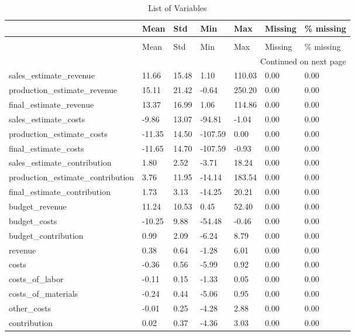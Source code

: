 \begin{landscape}\begin{longtable}[h!]{lllllll}
\caption{List of Variables} \label{eda_1} \\
\toprule
 & Mean & Std & Min & Max & Missing & \% missing \\
\midrule
\endfirsthead
\caption[]{List of Variables} \\
\toprule
 & Mean & Std & Min & Max & Missing & \% missing \\
\midrule
\endhead
\midrule
\multicolumn{7}{r}{Continued on next page} \\
\midrule
\endfoot
\bottomrule
\endlastfoot
sales_estimate_revenue & 11.66 & 15.48 & 1.10 & 110.03 & 0.00 & 0.00 \\
production_estimate_revenue & 15.11 & 21.42 & -0.64 & 250.20 & 0.00 & 0.00 \\
final_estimate_revenue & 13.37 & 16.99 & 1.06 & 114.86 & 0.00 & 0.00 \\
sales_estimate_costs & -9.86 & 13.07 & -94.81 & -1.04 & 0.00 & 0.00 \\
production_estimate_costs & -11.35 & 14.50 & -107.59 & 0.00 & 0.00 & 0.00 \\
final_estimate_costs & -11.65 & 14.70 & -107.59 & -0.93 & 0.00 & 0.00 \\
sales_estimate_contribution & 1.80 & 2.52 & -3.71 & 18.24 & 0.00 & 0.00 \\
production_estimate_contribution & 3.76 & 11.95 & -14.14 & 183.54 & 0.00 & 0.00 \\
final_estimate_contribution & 1.73 & 3.13 & -14.25 & 20.21 & 0.00 & 0.00 \\
budget_revenue & 11.24 & 10.53 & 0.45 & 52.40 & 0.00 & 0.00 \\
budget_costs & -10.25 & 9.88 & -54.48 & -0.46 & 0.00 & 0.00 \\
budget_contribution & 0.99 & 2.09 & -6.24 & 8.79 & 0.00 & 0.00 \\
revenue & 0.38 & 0.64 & -1.28 & 6.01 & 0.00 & 0.00 \\
costs & -0.36 & 0.56 & -5.99 & 0.92 & 0.00 & 0.00 \\
costs_of_labor & -0.11 & 0.15 & -1.33 & 0.05 & 0.00 & 0.00 \\
costs_of_materials & -0.24 & 0.44 & -5.06 & 0.95 & 0.00 & 0.00 \\
other_costs & -0.01 & 0.25 & -4.28 & 2.88 & 0.00 & 0.00 \\
contribution & 0.02 & 0.37 & -4.36 & 3.03 & 0.00 & 0.00 \\

\end{longtable}
\end{landscape}
